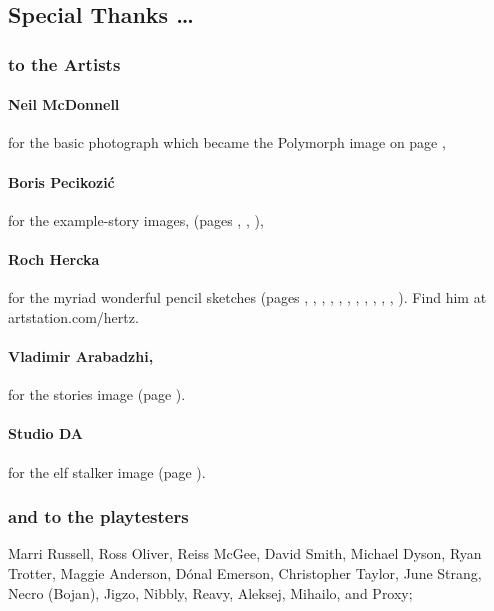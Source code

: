 \subsection*{Special Thanks \ldots}

\begin{multicols}{2}

\subsubsection*{to the Artists}

\paragraph{Neil McDonnell} for the basic photograph which became the Polymorph image on page \pageref{roch:polymorph},

\paragraph{Boris Pecikozi\'c} for the example-story images, (pages 
\pageref{Boris_Pecikozic/nura_jump}, 
\pageref{Boris_Pecikozic/nura_brawl}, 
\pageref{Boris_Pecikozic/dwarves_meet}), 

\paragraph{Roch Hercka} for the myriad wonderful pencil sketches (pages 
\pageref{Roch_Hercka/five_races}, 
\pageref{roch:dwarf}, 
\pageref{Roch_Hercka/stances}, 
\pageref{roch:vitals}, 
\pageref{roch:xp1}, 
\pageref{roch:xp2}, 
\pageref{Roch_Hercka/elvish_enchanter}, 
\pageref{roch:invocation}, 
\pageref{roch:polymorph}, 
\pageref{roch:runes}, 
\pageref{Roch_Hercka/illusion_trogdor}, 
\pageref{Roch_Hercka/flashing_light}
).
Find him at artstation.com/hertz.


\paragraph{Vladimir Arabadzhi,}
for the stories image (page \pageref{Vladimir_Arabadzhi/escape}).

\paragraph{Studio DA}
for the elf stalker image
(page \pageref{Studio_DA/elf_stalker}).

\subsubsection*{and to the playtesters} Marri Russell, Ross Oliver, Reiss McGee, David Smith, Michael Dyson, Ryan Trotter, Maggie Anderson, 
D\'{o}nal Emerson, Christopher Taylor, June Strang, 
Necro (Bojan), Jigzo, Nibbly, Reavy, 
Aleksej, Mihailo, and Proxy;


\end{multicols}
